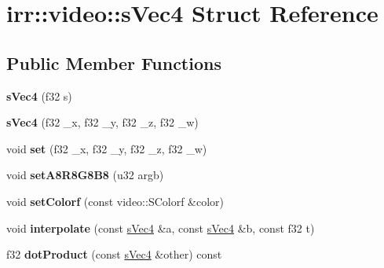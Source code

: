 \hypertarget{structirr_1_1video_1_1s_vec4}{\section{irr\-:\-:video\-:\-:s\-Vec4 Struct Reference}
\label{structirr_1_1video_1_1s_vec4}
}
\subsection*{Public Member Functions}
\begin{DoxyCompactItemize}
\item 
\hypertarget{structirr_1_1video_1_1s_vec4_a2af0efc8fd675c3e4c23d3f9e6dc941e}{{\bfseries s\-Vec4} (f32 s)}\label{structirr_1_1video_1_1s_vec4_a2af0efc8fd675c3e4c23d3f9e6dc941e}

\item 
\hypertarget{structirr_1_1video_1_1s_vec4_a836fcdd15d07100a6a055fb8de149225}{{\bfseries s\-Vec4} (f32 \-\_\-x, f32 \-\_\-y, f32 \-\_\-z, f32 \-\_\-w)}\label{structirr_1_1video_1_1s_vec4_a836fcdd15d07100a6a055fb8de149225}

\item 
\hypertarget{structirr_1_1video_1_1s_vec4_a81b4002bcb075424735b1c3805bf6803}{void {\bfseries set} (f32 \-\_\-x, f32 \-\_\-y, f32 \-\_\-z, f32 \-\_\-w)}\label{structirr_1_1video_1_1s_vec4_a81b4002bcb075424735b1c3805bf6803}

\item 
\hypertarget{structirr_1_1video_1_1s_vec4_a91b3d7b5af892d3eedc9908d163681fe}{void {\bfseries set\-A8\-R8\-G8\-B8} (u32 argb)}\label{structirr_1_1video_1_1s_vec4_a91b3d7b5af892d3eedc9908d163681fe}

\item 
\hypertarget{structirr_1_1video_1_1s_vec4_a9b12a4c1a624b1cbc5b6db98b38cfb97}{void {\bfseries set\-Colorf} (const video\-::\-S\-Colorf \&color)}\label{structirr_1_1video_1_1s_vec4_a9b12a4c1a624b1cbc5b6db98b38cfb97}

\item 
\hypertarget{structirr_1_1video_1_1s_vec4_a6299ffd8c04b9d49c6ffa3c6e8f2ed7a}{void {\bfseries interpolate} (const \hyperlink{structirr_1_1video_1_1s_vec4}{s\-Vec4} \&a, const \hyperlink{structirr_1_1video_1_1s_vec4}{s\-Vec4} \&b, const f32 t)}\label{structirr_1_1video_1_1s_vec4_a6299ffd8c04b9d49c6ffa3c6e8f2ed7a}

\item 
\hypertarget{structirr_1_1video_1_1s_vec4_af8447ea7149d263a1310afe12d75a020}{f32 {\bfseries dot\-Product} (const \hyperlink{structirr_1_1video_1_1s_vec4}{s\-Vec4} \&other) const }\label{structirr_1_1video_1_1s_vec4_af8447ea7149d263a1310afe12d75a020}


\end{DoxyCompactItemize}
